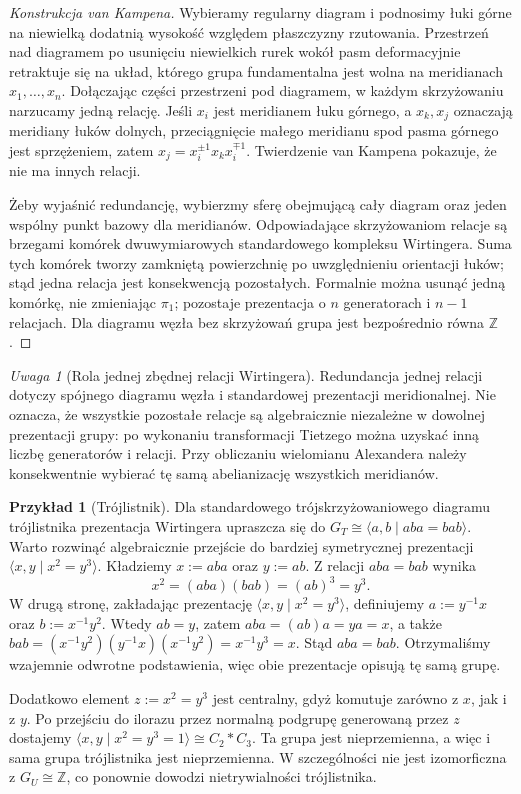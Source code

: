 \documentclass[11pt,a4paper]{report}
\numberwithin{equation}{section}
\theoremstyle{plain}
\theoremstyle{definition}
\newtheorem{przyklad}[twierdzenie]{Przykład}
\theoremstyle{remark}
\newtheorem{uwaga}[twierdzenie]{Uwaga}
\begin{document}
\begin{proof}[Konstrukcja van Kampena]
Wybieramy regularny diagram i podnosimy łuki górne na
niewielką dodatnią wysokość względem płaszczyzny rzutowania.
Przestrzeń nad diagramem po usunięciu niewielkich rurek
wokół pasm deformacyjnie retraktuje się na układ, którego
grupa fundamentalna jest wolna na meridianach $x_1,\dots,x_n$.
Dołączając części przestrzeni pod diagramem, w każdym
skrzyżowaniu narzucamy jedną relację. Jeśli $x_i$ jest
meridianem łuku górnego, a $x_k,x_j$ oznaczają meridiany
łuków dolnych, przeciągnięcie małego meridianu spod pasma
górnego jest sprzężeniem, zatem $x_j=x_i^{\pm1}x_kx_i^{\mp1}$.
Twierdzenie van Kampena pokazuje, że nie ma innych relacji.

Żeby wyjaśnić redundancję, wybierzmy sferę obejmującą
cały diagram oraz jeden wspólny punkt bazowy dla meridianów.
Odpowiadające skrzyżowaniom relacje są brzegami
komórek dwuwymiarowych standardowego kompleksu Wirtingera.
Suma tych komórek tworzy zamkniętą powierzchnię po uwzględnieniu
orientacji łuków; stąd jedna relacja jest konsekwencją
pozostałych. Formalnie można usunąć jedną komórkę, nie
zmieniając $\pi_1$; pozostaje prezentacja o $n$ generatorach
i $n-1$ relacjach. Dla diagramu węzła bez skrzyżowań
grupa jest bezpośrednio równa $\mathbb Z$.
\end{proof}

\begin{uwaga}[Rola jednej zbędnej relacji Wirtingera]
Redundancja jednej relacji dotyczy spójnego diagramu węzła
i standardowej prezentacji meridionalnej. Nie oznacza,
że wszystkie pozostałe relacje są algebraicznie niezależne
w dowolnej prezentacji grupy: po wykonaniu transformacji
Tietzego można uzyskać inną liczbę generatorów i relacji.
Przy obliczaniu wielomianu Alexandera należy konsekwentnie
wybierać tę samą abelianizację wszystkich meridianów.
\end{uwaga}

\begin{przyklad}[Trójlistnik]
Dla standardowego trójskrzyżowaniowego diagramu trójlistnika
prezentacja Wirtingera upraszcza się do
$G_T\cong\langle a,b\mid aba=bab\rangle$.
Warto rozwinąć algebraicznie przejście do bardziej symetrycznej
prezentacji
$\langle x,y\mid x^2=y^3\rangle$.
Kładziemy $x:=aba$ oraz $y:=ab$. Z relacji $aba=bab$ wynika
\[
x^2=(aba)(bab)=(ab)^3=y^3.
\]
W drugą stronę, zakładając prezentację $\langle x,y\mid x^2=y^3\rangle$,
definiujemy
$a:=y^{-1}x$ oraz $b:=x^{-1}y^2$. Wtedy $ab=y$, zatem
$aba=(ab)a=ya=x$, a także
$bab=(x^{-1}y^2)(y^{-1}x)(x^{-1}y^2)=x^{-1}y^3=x$.
Stąd $aba=bab$. Otrzymaliśmy wzajemnie odwrotne podstawienia,
więc obie prezentacje opisują tę samą grupę.

Dodatkowo element $z:=x^2=y^3$ jest centralny, gdyż komutuje
zarówno z $x$, jak i z $y$. Po przejściu do ilorazu przez normalną
podgrupę generowaną przez $z$ dostajemy
$\langle x,y\mid x^2=y^3=1\rangle\cong C_2*C_3$.
Ta grupa jest nieprzemienna, a więc i sama grupa trójlistnika
jest nieprzemienna. W szczególności nie jest izomorficzna z
$G_U\cong\mathbb Z$, co ponownie dowodzi nietrywialności
trójlistnika.
\end{przyklad}
\end{document}
